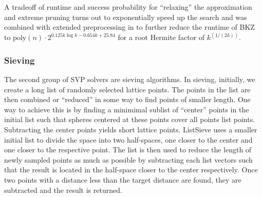 A tradeoff of runtime and success probability for ``relaxing'' the approximation and extreme pruning turns out to exponentially speed up the search \cite{LN20} and was combined with extended preprocessing in \cite{ABFKSW20} to further reduce the runtime of BKZ to $\text{poly}(n) \cdot 2^{0.125k \log k - 0.654k + 25.84}$ for a root Hermite factor of $k^(1/(2k))$. 






\subsubsection{Sieving} 
The second group of SVP solvers are sieving algorithms. In sieving, initially, we create a long list of randomly selected lattice points. The points in the list are then combined or ``reduced'' in some way to find points of smaller length. One way to achieve this is by finding a minimimal sublist of ``center'' points in the initial list such that spheres centered at these points cover all points list points. Subtracting the center points yields short lattice points. ListSieve \cite{MV10} uses a smaller initial list to divide the space into two half-spaces, one closer to the center and one closer to the respective point. The list is then used to reduce the length of newly sampled points as much as possible by subtracting each list vectors such that the result is located in the half-space closer to the center respectively. Once two points with a distance less than the target distance are found, they are subtracted and the result is returned. 

